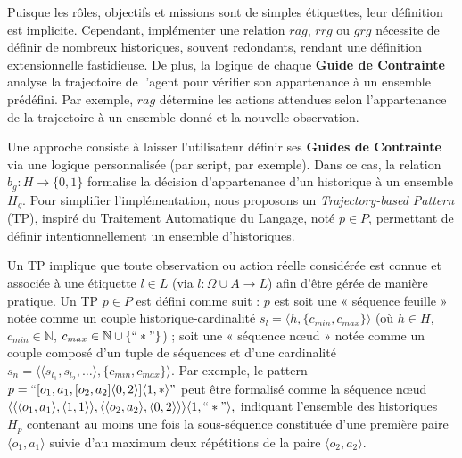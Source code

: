 \documentclass[dissemination]{jfsma}
\begin{document}
Puisque les rôles, objectifs et missions sont de simples étiquettes, leur définition est implicite. Cependant, implémenter une relation \(rag\), \(rrg\) ou \(grg\) nécessite de définir de nombreux historiques, souvent redondants, rendant une définition extensionnelle fastidieuse. De plus, la logique de chaque \textbf{Guide de Contrainte} analyse la trajectoire de l'agent pour vérifier son appartenance à un ensemble prédéfini. Par exemple, \(rag\) détermine les actions attendues selon l'appartenance de la trajectoire à un ensemble donné et la nouvelle observation.

Une approche consiste à laisser l'utilisateur définir ses \textbf{Guides de Contrainte} via une logique personnalisée (par script, par exemple). Dans ce cas, la relation \(b_g: H \to \{0,1\}\) formalise la décision d'appartenance d'un historique à un ensemble \(H_g\).
Pour simplifier l'implémentation, nous proposons un \textit{Trajectory-based Pattern} (TP), inspiré du Traitement Automatique du Langage, noté \(p \in P\), permettant de définir intentionnellement un ensemble d'historiques.

Un TP implique que toute observation ou action réelle considérée est connue et associée à une étiquette \(l \in L\) (via \(l: \Omega \cup A \to L\)) afin d'être gérée de manière pratique. Un TP \(p \in P\) est défini comme suit : \(p\) est soit une « séquence feuille » notée comme un couple historique-cardinalité \(s_l = \langle h, \{c_{min}, c_{max}\} \rangle\) (où \(h \in H\), \(c_{min} \in \mathbb{N}\), \(c_{max} \in \mathbb{N} \cup \{``*"\}\)) ; soit une « séquence nœud » notée comme un couple composé d'un tuple de séquences et d'une cardinalité \(s_n = \langle \langle s_{l_1}, s_{l_2}, \dots \rangle, \{c_{min}, c_{max}\} \rangle\). Par exemple, le pattern 
$
p = ``[o_1,a_1,[o_2,a_2]\langle0,2\rangle]\langle1,*\rangle"
$
peut être formalisé comme la séquence nœud
$
\langle \langle \langle o_1,a_1\rangle,\langle 1,1 \rangle \rangle, \langle \langle o_2,a_2\rangle,\langle 0,2 \rangle \rangle \rangle \langle 1,``*"\rangle,
$
indiquant l'ensemble des historiques \(H_p\) contenant au moins une fois la sous-séquence constituée d'une première paire \(\langle o_1,a_1\rangle\) suivie d'au maximum deux répétitions de la paire \(\langle o_2,a_2\rangle\).

\end{document}
